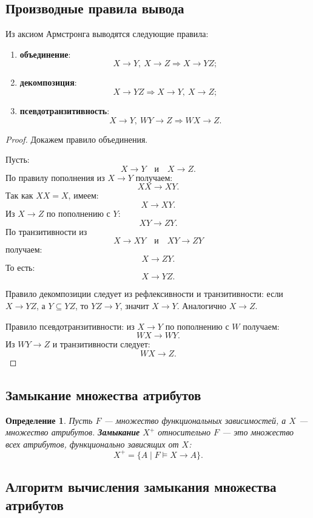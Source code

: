 \documentclass[12pt,a4paper]{article}
\newtheorem{definition}{Определение}[section]
\theoremstyle{remark}
\begin{document}
\subsection{Производные правила вывода}

Из аксиом Армстронга выводятся следующие правила:

\begin{enumerate}
    \item \textbf{объединение}:
    \[
    X \to Y,\ X \to Z \Rightarrow X \to YZ;
    \]

    \item \textbf{декомпозиция}:
    \[
    X \to YZ \Rightarrow X \to Y,\ X \to Z;
    \]

    \item \textbf{псевдотранзитивность}:
    \[
    X \to Y,\ WY \to Z \Rightarrow WX \to Z.
    \]
\end{enumerate}

\begin{proof}
Докажем правило объединения.

Пусть:
\[
X \to Y
\quad \text{и} \quad
X \to Z.
\]
По правилу пополнения из $X \to Y$ получаем:
\[
XX \to XY.
\]
Так как $XX=X$, имеем:
\[
X \to XY.
\]
Из $X \to Z$ по пополнению с $Y$:
\[
XY \to ZY.
\]
По транзитивности из
\[
X \to XY
\quad \text{и} \quad
XY \to ZY
\]
получаем:
\[
X \to ZY.
\]
То есть:
\[
X \to YZ.
\]

Правило декомпозиции следует из рефлексивности и транзитивности:
если $X \to YZ$, а $Y \subseteq YZ$, то $YZ \to Y$, значит $X \to Y$.
Аналогично $X \to Z$.

Правило псевдотранзитивности:
из $X \to Y$ по пополнению с $W$ получаем:
\[
WX \to WY.
\]
Из $WY \to Z$ и транзитивности следует:
\[
WX \to Z.
\]
\end{proof}

\subsection{Замыкание множества атрибутов}

\begin{definition}
Пусть $F$ --- множество функциональных зависимостей, а $X$ --- множество атрибутов.
\textbf{Замыкание} $X^+$ относительно $F$ --- это множество всех атрибутов, функционально зависящих от $X$:
\[
X^+ = \{A \mid F \models X \to A\}.
\]
\end{definition}

\subsection{Алгоритм вычисления замыкания множества атрибутов}
\end{document}
